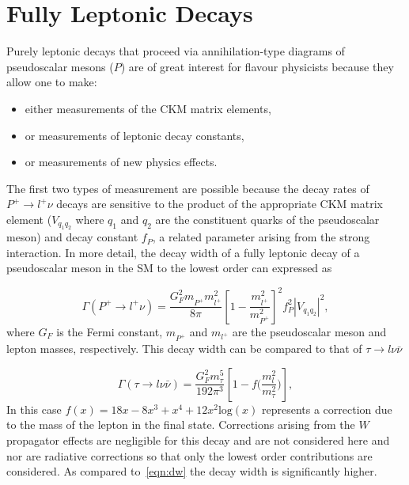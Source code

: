 \section{Fully Leptonic  Decays}
\label{lnudecays}
Purely leptonic decays that proceed via annihilation-type diagrams of pseudoscalar mesons ($P$) are of great interest for flavour physicists because they allow one to make:
\begin{itemize}
\item either measurements of the \gls{CKM} matrix elements,
\item or measurements of leptonic decay constants,
\item or measurements of new physics effects.
\end{itemize}
The first two types of measurement are possible because the decay rates of $P^{+}\rightarrow l^{+} \nu$ decays are sensitive to the product of the appropriate \gls{CKM} matrix element ($V_{q_{1}q_{2}}$ where $q_{1}$ and $q_{2}$ are the constituent quarks of the pseudoscalar meson) and decay constant $f_{P}$, a related parameter arising from the strong interaction. In more detail, the decay width of a fully leptonic decay of a pseudoscalar meson in the \gls{SM} to the lowest order can expressed as 

\begin{equation}
\Gamma(P^{+} \rightarrow {l^{+}} \nu)=  
	\frac{G_{F}^{2} m^{}_{P^{+}}  m_{l^{+}}^{2}}{8\pi} 
	\left[1 - \frac{m_{l^{+}}^{2}}{m_{P^{+}}^{2}}\right]^{2}  
	f_{P}^{2} |V_{q_{1}q_{2}}|^{2} 
	,
\label{eqn:dw} 
\end{equation}
where
$G_F$ is the Fermi constant,
$m^{}_{P^{+}}$ and $m_{l^{+}}$ are the pseudoscalar meson and lepton masses, respectively. This decay width can be compared to that of $\tau \rightarrow l\nu \bar{\nu}$\cite{Marciano:1988vm}


\begin{equation}
\Gamma(\tau \rightarrow {l} \nu \bar{\nu})=
	\frac{G^{2}_{F} m^{5}_{\tau}}{192\pi^{3}}\left[1-f\big(\frac{m^{2}_{l}}{{m^{2}_{\tau}}}\big)\right],
\label{eqn:tauonic} 
\end{equation}
In this case $ f(x) = 1  8x - 8x^{3} + x^{4} + 12x^{2}\mathrm{log}(x)$ represents a correction due to the mass of the lepton
in the final state. Corrections arising from the $W$ propagator effects are negligible for this decay and are not considered here and nor are radiative corrections so that only the lowest order contributions are considered. As compared to~\autoref{eqn:dw} the decay width is significantly higher. 

